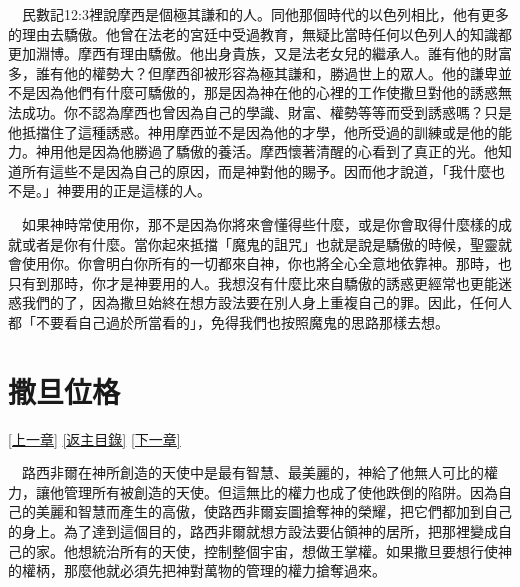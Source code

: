 \documentclass{book}
\begin{document}
　民數記12:3裡說摩西是個極其謙和的人。同他那個時代的以色列相比，他有更多的理由去驕傲。他曾在法老的宮廷中受過教育，無疑比當時任何以色列人的知識都更加淵博。摩西有理由驕傲。他出身貴族，又是法老女兒的繼承人。誰有他的財富多，誰有他的權勢大？但摩西卻被形容為極其謙和，勝過世上的眾人。他的謙卑並不是因為他們有什麼可驕傲的，那是因為神在他的心裡的工作使撒旦對他的誘惑無法成功。你不認為摩西也曾因為自己的學識、財富、權勢等等而受到誘惑嗎？只是他抵擋住了這種誘惑。神用摩西並不是因為他的才學，他所受過的訓練或是他的能力。神用他是因為他勝過了驕傲的養活。摩西懷著清醒的心看到了真正的光。他知道所有這些不是因為自己的原因，而是神對他的賜予。因而他才說道，「我什麼也不是。」神要用的正是這樣的人。

　如果神時常使用你，那不是因為你將來會懂得些什麼，或是你會取得什麼樣的成就或者是你有什麼。當你起來抵擋「魔鬼的詛咒」也就是說是驕傲的時候，聖靈就會使用你。你會明白你所有的一切都來自神，你也將全心全意地依靠神。那時，也只有到那時，你才是神要用的人。我想沒有什麼比來自驕傲的誘惑更經常也更能迷惑我們的了，因為撒旦始終在想方設法要在別人身上重複自己的罪。因此，任何人都「不要看自己過於所當看的」，免得我們也按照魔鬼的思路那樣去想。

\chapter{撒旦位格}
\label{sec:ch03}
\hyperref[sec:ch02]{[上一章]}
\hyperlink{toc}{[返主目錄]}
\hyperref[sec:ch04]{[下一章]}

\begin{center}
\noindent{}
\end{center}

　路西非爾在神所創造的天使中是最有智慧、最美麗的，神給了他無人可比的權力，讓他管理所有被創造的天使。但這無比的權力也成了使他跌倒的陷阱。因為自己的美麗和智慧而產生的高傲，使路西非爾妄圖搶奪神的榮耀，把它們都加到自己的身上。為了達到這個目的，路西非爾就想方設法要佔領神的居所，把那裡變成自己的家。他想統治所有的天使，控制整個宇宙，想做王掌權。如果撒旦要想行使神的權柄，那麼他就必須先把神對萬物的管理的權力搶奪過來。
\end{document}
